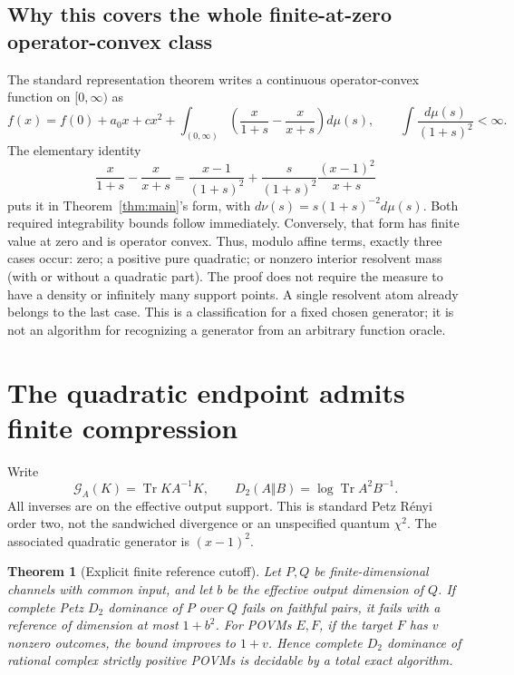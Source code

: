 \documentclass[11pt]{article}
\newtheorem{theorem}{Theorem}
\newcommand{\Tr}{\operatorname{Tr}}
\begin{document}
\subsection{Why this covers the whole finite-at-zero operator-convex class}
The standard representation theorem \cite[Theorem 7.1]{hiai} writes a continuous
operator-convex function on $[0,\infty)$ as
\[
 f(x)=f(0)+a_0x+c x^2+
 \int_{(0,\infty)}\left(\frac{x}{1+s}-\frac{x}{x+s}\right)d\mu(s),
 \qquad \int\frac{d\mu(s)}{(1+s)^2}<\infty.
\]
The elementary identity
\[
 \frac{x}{1+s}-\frac{x}{x+s}
 =\frac{x-1}{(1+s)^2}
 +\frac{s}{(1+s)^2}\frac{(x-1)^2}{x+s}
\]
puts it in Theorem~\ref{thm:main}'s form, with
$d\nu(s)=s(1+s)^{-2}d\mu(s)$. Both required integrability bounds follow
immediately. Conversely, that form has finite value at zero and is operator
convex. Thus, modulo affine terms, exactly three cases occur: zero; a positive
pure quadratic; or nonzero interior resolvent mass (with or without a quadratic
part). The proof does not require the measure to have a density or infinitely
many support points. A single resolvent atom already belongs to the last case.
This is a classification for a fixed chosen generator; it is not an algorithm
for recognizing a generator from an arbitrary function oracle.

\section{The quadratic endpoint admits finite compression}
Write
\[
 \mathcal G_A(K)=\Tr KA^{-1}K,
 \qquad D_2(A\Vert B)=\log\Tr A^2B^{-1}.
\]
All inverses are on the effective output support. This is standard Petz
R\'enyi order two, not the sandwiched divergence or an unspecified quantum
$\chi^2$. The associated quadratic generator is $(x-1)^2$.

\begin{theorem}[Explicit finite reference cutoff]\label{thm:rld}
Let $P,Q$ be finite-dimensional channels with common input, and let $b$ be the
effective output dimension of $Q$. If complete Petz $D_2$ dominance of $P$ over
$Q$ fails on faithful pairs, it fails with a reference of dimension at most
$1+b^2$. For POVMs $E,F$, if the target $F$ has $v$ nonzero outcomes, the bound
improves to $1+v$. Hence complete $D_2$ dominance of rational complex strictly
positive POVMs is decidable by a total exact algorithm.
\end{theorem}
\end{document}
